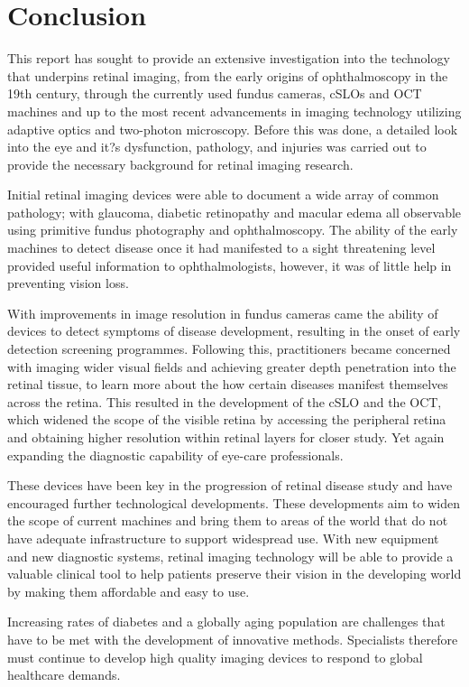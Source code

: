 \chapter{Conclusion}

\label{conclusion}

This report has sought to provide an extensive investigation
into the technology that underpins retinal imaging, from the
early origins of ophthalmoscopy in the 19th century, through the 
currently used fundus cameras, cSLOs and OCT machines and up 
to the most recent advancements in imaging technology utilizing 
adaptive optics and two-photon microscopy. Before this was done, 
a detailed look into the eye and it?s dysfunction, pathology, and 
injuries was carried out to provide the necessary background for 
retinal imaging research.

Initial retinal imaging devices were able to document a wide array 
of common pathology; with glaucoma, diabetic retinopathy and macular 
edema all observable using primitive fundus photography and 
ophthalmoscopy. The ability of the early machines to detect 
disease once it had manifested to a sight threatening level provided 
useful information to ophthalmologists, however, it was of little help 
in preventing vision loss. 

With improvements in image resolution in fundus cameras came 
the ability of devices to detect symptoms of disease development, 
resulting in the onset of early detection screening programmes. 
Following this, practitioners became concerned with imaging 
wider visual fields and achieving greater depth penetration into 
the retinal tissue, to learn more about the how certain diseases 
manifest themselves across the retina. This resulted in the 
development of the cSLO and the OCT, which widened the scope 
of the visible retina by accessing the peripheral retina and obtaining 
higher resolution within retinal layers for closer study.  Yet again 
expanding the diagnostic capability of eye-care professionals. 

These devices have been key in the progression of retinal disease 
study and have encouraged further technological developments. 
These developments aim to widen the scope of current machines 
and bring them to areas of the world that do not have adequate 
infrastructure to support widespread use. With new equipment and 
new diagnostic systems, retinal imaging technology will be able to 
provide a valuable clinical tool to help patients preserve their vision 
in the developing world by making them affordable and easy to use.
 
Increasing rates of diabetes and a globally aging population are 
challenges that have to be met with the development of innovative 
methods. Specialists therefore must continue to develop high 
quality imaging devices to respond to global healthcare demands. 